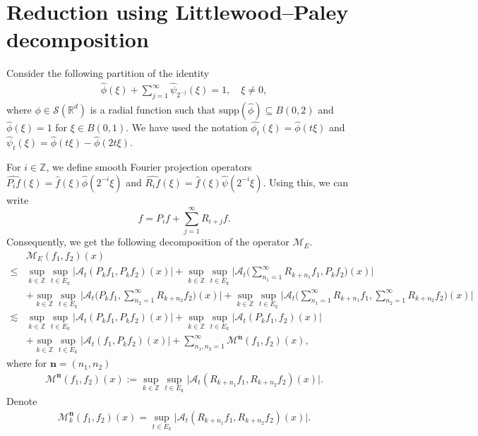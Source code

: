 \documentclass[a4paper,reqno]{amsart}
\numberwithin{equation}{section}
\newcommand{\R}{{\mathbb {R}}}
\newcommand{\Z}{{\mathbb Z}}
\begin{document}
	\section{Reduction using Littlewood--Paley decomposition}\label{sec:reductionlp}	
	Consider the following partition of the identity 
	\begin{align*}\label{identity}
		\widehat \phi(\xi)+\sum_{j=1}^\infty\widehat \psi_{2^{-j}}(\xi)=1,\quad\xi\neq 0,
	\end{align*}
	where $\phi\in \mathcal S(\R^d)$ is a radial function such that $\text{supp}(\widehat\phi)\subseteq B(0,2)$ and $\widehat\phi(\xi)=1$ for $\xi\in B(0,1)$. We have used the notation   $\widehat{\phi_t}(\xi)=\widehat\phi(t\xi)$ and 
	$\widehat{\psi}_t(\xi)= \widehat{\phi}(t\xi)-\widehat{\phi}(2t\xi)$. 
	
	For $i\in\Z$, we define smooth Fourier projection operators $\widehat{P_if}(\xi)=\hat{f}(\xi)\hat{\phi}(2^{-i}\xi)$ and $\widehat{R_{i}f}(\xi)=\hat{f}(\xi)\hat{\psi}(2^{-i}\xi)$. Using this, we can write  
	\[f=P_if+\sum_{j=1}^\infty R_{i+j}f.\]
	Consequently, we get the following decomposition of the operator $\mathcal{M}_{E}$.
	\begin{align}\label{deco}
		&\mathcal{M}_{E}(f_1,f_2)(x)\nonumber\\\nonumber	\leq & \sup_{k\in\Z}\sup_{t\in E_k}\Big|\mathcal{A}_{t}(P_kf_1,P_kf_2)(x)\Big|+\sup_{k\in\Z}\sup_{t\in E_k}\bigg|\mathcal{A}_{t}\Big(\sum^{\infty}_{n_1=1}R_{k+n_1}f_1,P_kf_2\Big)(x)\bigg|
		\\\nonumber
		&+\sup_{k\in\Z}\sup_{t\in E_k}\bigg|\mathcal{A}_{t}\Big(P_kf_1,\sum^{\infty}_{n_2=1}R_{k+n_2}f_2\Big)(x)\bigg|+\sup_{k\in\Z}\sup_{t\in E_k}\Big|\mathcal{A}_{t}\Big(\sum^{\infty}_{n_1=1}R_{k+n_1}f_1,\sum^{\infty}_{n_2=1}R_{k+n_2}f_2\Big)(x) \bigg|\\\nonumber
		\lesssim & \sup_{k\in\Z}\sup_{t\in E_k}\Big|\mathcal{A}_{t}(P_kf_1,P_kf_2)(x)\Big|+\sup_{k\in\Z}\sup_{t\in E_k}\Big|\mathcal{A}_{t}(P_kf_1,f_2)(x)\Big|
		\\
		&+\sup_{k\in\Z}\sup_{t\in E_k}\Big|\mathcal{A}_{t}(f_1,P_kf_2)(x)\Big|+\sum^{\infty}_{n_1,n_2=1}\mathcal{M}^{\mathbf{n}}(f_1,f_2)(x),
	\end{align}
	where for $\mathbf{n}=(n_1,n_2)$
	\begin{align*}
		\mathcal{M}^{\mathbf{n}}(f_1,f_2)(x):=\sup_{k\in \Z}\sup_{t\in E_k}\Big|\mathcal{A}_{t}(R_{k+n_1}f_1,R_{k+n_2}f_2)(x)\Big|.
	\end{align*}
	Denote 
	\begin{align*}
		\mathcal{M}^{\mathbf{n}}_k(f_1,f_2)(x)=\sup_{t\in E_k}\Big|\mathcal{A}_{t}(R_{k+n_1}f_1,R_{k+n_2}f_2)(x)\Big|.
	\end{align*}
\end{document}
